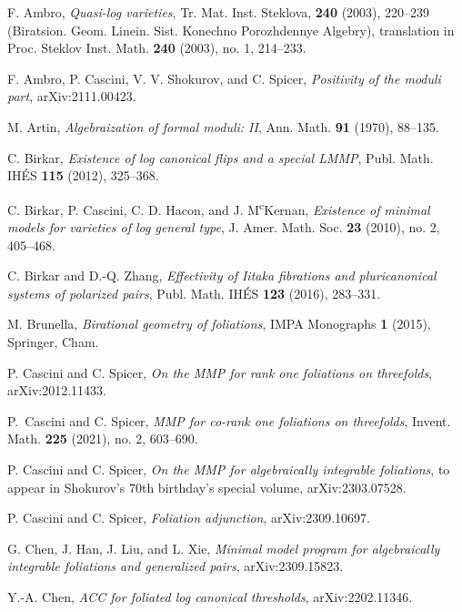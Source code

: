 \documentclass[12pt]{amsart}
\numberwithin{equation}{section}
\theoremstyle{definition}
\theoremstyle{definition}
\theoremstyle{definition}
\begin{document}
\begin{thebibliography}{99}


 F. Ambro, \textit{Quasi-log varieties}, Tr. Mat. Inst. Steklova, \textbf{240} (2003), 220--239 (Biratsion. Geom. Linein. Sist. Konechno Porozhdennye Algebry), translation in Proc. Steklov Inst. Math. \textbf{240} (2003), no. 1, 214--233.

 F. Ambro, P. Cascini, V. V. Shokurov, and C. Spicer, \textit{Positivity of the moduli part}, arXiv:2111.00423.


 M. Artin, \textit{Algebraization of formal moduli: II}, Ann. Math. \textbf{91} (1970), 88--135.

 
 C. Birkar, \textit{Existence of log canonical flips and a special LMMP}, Publ. Math. IHÉS \textbf{115} (2012), 325--368.

 C. Birkar, P. Cascini, C. D. Hacon, and J. M\textsuperscript{c}Kernan, \textit{Existence of minimal models for varieties of log general type}, J. Amer. Math. Soc. \textbf{23} (2010), no. 2, 405--468.


 C. Birkar and D.-Q. Zhang, \textit{Effectivity of Iitaka fibrations and pluricanonical systems of polarized pairs}, Publ. Math. IHÉS \textbf{123} (2016), 283--331.


 M. Brunella, \textit{Birational geometry of foliations}, IMPA Monographs \textbf{1} (2015), Springer, Cham.

 P. Cascini and C. Spicer, \textit{On the MMP for rank one foliations on threefolds}, arXiv:2012.11433.

 P.~Cascini and C. Spicer, \textit{MMP for co-rank one foliations on threefolds}, Invent. Math. \textbf{225} (2021), no. 2, 603--690.

 P. Cascini and C. Spicer, \textit{On the MMP for algebraically integrable foliations}, to appear in Shokurov's 70th birthday's special volume, arXiv:2303.07528.

 P. Cascini and C. Spicer, \textit{Foliation adjunction}, arXiv:2309.10697.

 G. Chen, J. Han, J. Liu, and L. Xie, \textit{Minimal model program for algebraically integrable foliations and generalized pairs}, arXiv:2309.15823. 


 Y.-A. Chen, \textit{ACC for foliated log canonical thresholds}, arXiv:2202.11346.



\end{thebibliography}
\end{document}
